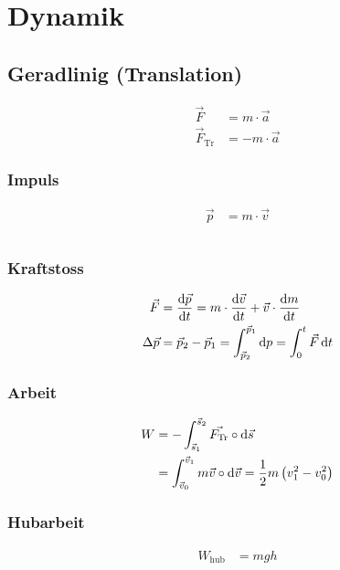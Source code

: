\newpage
\section{Dynamik}

\subsection{Geradlinig (Translation)}
\begin{align*}
\vec{F}&=m\cdot \vec{a}\\
\vec{F}_{\text{Tr}}&=-m\cdot \vec{a}
\end{align*}
\begin{multicols}{2}{}
\subsubsection{Impuls}
\begin{align*}
\vec{p}&=m\cdot \vec{v}\\ \\
\end{align*}

\subsubsection{Kraftstoss}
\begin{align*}
\vec{F}&=\frac{\diff \vec{p}}{\diff t}=m\cdot\frac{\diff \vec{v}}{\diff t}+\vec{v}\cdot\frac{\diff m}{\diff t}\\
\Delta\vec{p}&=\vec{p}_2-\vec{p}_1=\int_{\vec{p}_2}^{\vec{p}_1}\diff p=\int_0^{t}\vec{F}\diff t
\end{align*}
\end{multicols}

\begin{multicols}{2}{}
\subsubsection{Arbeit}
\begin{align*}
W&=-\int_{\vec{s}_1}^{\vec{s}_2}\vec{F_{\text{Tr}}}\circ\mathop{}\!\mathrm{d} \vec{s}\\
&=\int_{\vec{v}_0}^{\vec{v}_1}m\vec{v}\circ\mathop{}\!\mathrm{d} \vec{v}=\frac{1}{2}m\left(v_1^2-v_0^2\right) 
\end{align*}

\subsubsection{Hubarbeit}
\begin{align*}
W_{\text{hub}}&=mgh
\end{align*}
\end{multicols}

